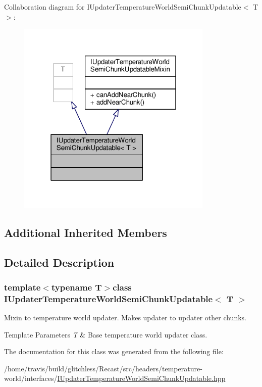 Collaboration diagram for I\-Updater\-Temperature\-World\-Semi\-Chunk\-Updatable$<$ T $>$\-:
\nopagebreak
\begin{figure}[H]
\begin{center}
\leavevmode
\includegraphics[width=265pt]{class_i_updater_temperature_world_semi_chunk_updatable__coll__graph}
\end{center}
\end{figure}
\subsection*{Additional Inherited Members}


\subsection{Detailed Description}
\subsubsection*{template$<$typename T$>$class I\-Updater\-Temperature\-World\-Semi\-Chunk\-Updatable$<$ T $>$}

Mixin to temperature world updater. Makes updater to updater other chunks.


\begin{DoxyTemplParams}{Template Parameters}
{\em T} & Base temperature world updater class. \\
\hline
\end{DoxyTemplParams}


The documentation for this class was generated from the following file\-:\begin{DoxyCompactItemize}
\item 
/home/travis/build/glitchless/\-Recast/src/headers/temperature-\/world/interfaces/\hyperlink{_i_updater_temperature_world_semi_chunk_updatable_8hpp}{I\-Updater\-Temperature\-World\-Semi\-Chunk\-Updatable.\-hpp}\end{DoxyCompactItemize}
